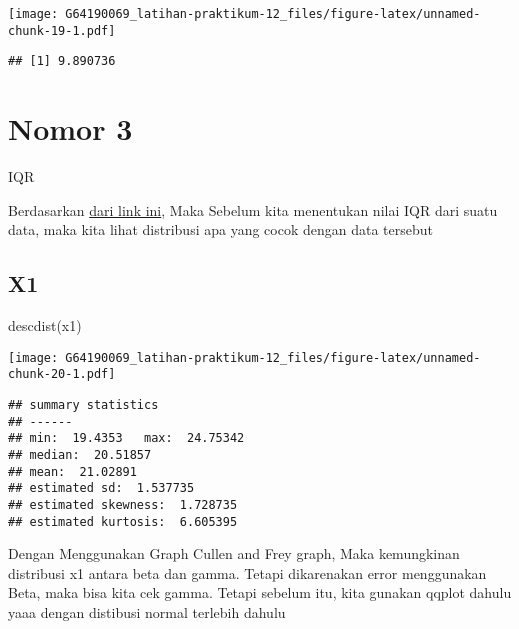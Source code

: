 \documentclass[
]{article}
\newenvironment{Shaded}{\begin{snugshade}}{\end{snugshade}}
\newcommand{\AttributeTok}[1]{\textcolor[rgb]{0.77,0.63,0.00}{#1}}
\newcommand{\FloatTok}[1]{\textcolor[rgb]{0.00,0.00,0.81}{#1}}
\newcommand{\FunctionTok}[1]{\textcolor[rgb]{0.00,0.00,0.00}{#1}}
\newcommand{\NormalTok}[1]{#1}
\newcommand{\OtherTok}[1]{\textcolor[rgb]{0.56,0.35,0.01}{#1}}
\newcommand{\SpecialCharTok}[1]{\textcolor[rgb]{0.00,0.00,0.00}{#1}}
\begin{document}
\texttt{[image: G64190069\_latihan-praktikum-12\_files/figure-latex/unnamed-chunk-19-1.pdf]}

\begin{Shaded}
\end{Shaded}

\begin{verbatim}
## [1] 9.890736
\end{verbatim}

\hypertarget{nomor-3}{%
\section{Nomor 3}\label{nomor-3}}

IQR

Berdasarkan
\href{https://web.ipac.caltech.edu/staff/fmasci/home/astro_refs/RobustEstimators.pdf}{dari
link ini}, Maka Sebelum kita menentukan nilai IQR dari suatu data, maka
kita lihat distribusi apa yang cocok dengan data tersebut

\hypertarget{x1-1}{%
\subsection{X1}\label{x1-1}}

\begin{Shaded}
\begin{Highlighting}[]
\FunctionTok{descdist}\NormalTok{(x1)}
\end{Highlighting}
\end{Shaded}

\texttt{[image: G64190069\_latihan-praktikum-12\_files/figure-latex/unnamed-chunk-20-1.pdf]}

\begin{verbatim}
## summary statistics
## ------
## min:  19.4353   max:  24.75342 
## median:  20.51857 
## mean:  21.02891 
## estimated sd:  1.537735 
## estimated skewness:  1.728735 
## estimated kurtosis:  6.605395
\end{verbatim}

Dengan Menggunakan Graph Cullen and Frey graph, Maka kemungkinan
distribusi x1 antara beta dan gamma. Tetapi dikarenakan error
menggunakan Beta, maka bisa kita cek gamma. Tetapi sebelum itu, kita
gunakan qqplot dahulu yaaa dengan distibusi normal terlebih dahulu
\end{document}
